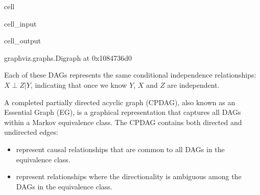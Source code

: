 \documentclass[letterpaper,10pt,english]{jupyterBook}
\begin{document}
\begin{sphinxuseclass}{cell}\begin{sphinxVerbatimInput}

\begin{sphinxuseclass}{cell_input}
\begin{sphinxVerbatim}[commandchars=\\\{\}]
  
 
 
\end{sphinxVerbatim}

\end{sphinxuseclass}\end{sphinxVerbatimInput}
\begin{sphinxVerbatimOutput}

\begin{sphinxuseclass}{cell_output}
\begin{sphinxVerbatim}[commandchars=\\\{\}]
\PYGZlt{}graphviz.graphs.Digraph at 0x1084736d0\PYGZgt{}
\end{sphinxVerbatim}

\end{sphinxuseclass}\end{sphinxVerbatimOutput}

\end{sphinxuseclass}
\sphinxAtStartPar
Each of these DAGs represents the same conditional independence relationships: \(X \perp Z | Y\), indicating that once we know \(Y\), \(X\) and \(Z\) are independent.

\sphinxAtStartPar
A completed partially directed acyclic graph (CPDAG), also known as an Essential Graph (EG), is a graphical representation that captures all DAGs within a Markov equivalence class. The CPDAG contains both directed and undirected edges:
\begin{itemize}
\item {} 
\sphinxAtStartPar
{} represent causal relationships that are common to all DAGs in the equivalence class.

\item {} 
\sphinxAtStartPar
{} represent relationships where the directionality is ambiguous among the DAGs in the equivalence class.

\end{itemize}
\end{document}
